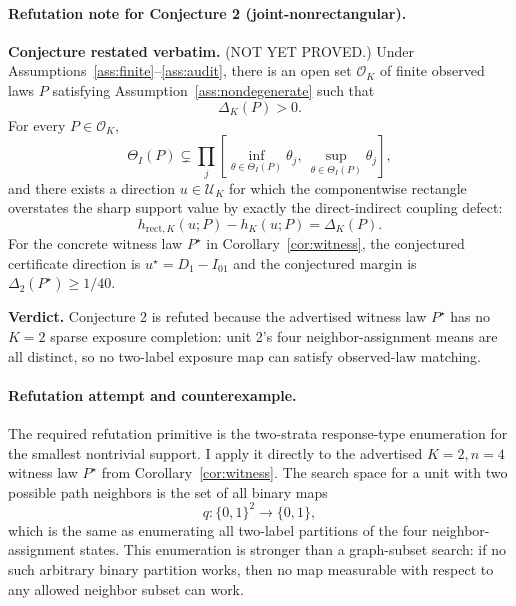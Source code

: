 \paragraph{Refutation note for Conjecture 2 (joint-nonrectangular).}
\textbf{Conjecture restated verbatim.}
(NOT YET PROVED.)  Under Assumptions~\ref{ass:finite}--\ref{ass:audit}, there is an open set \(\mathcal O_K\) of finite observed laws \(P\) satisfying Assumption~\ref{ass:nondegenerate} such that
\[
\Delta_K(P)>0.
\]
For every \(P\in\mathcal O_K\),
\[
\Theta_I(P)\subsetneq
\prod_j [\inf_{\theta\in\Theta_I(P)}\theta_j,\ \sup_{\theta\in\Theta_I(P)}\theta_j],
\]
and there exists a direction \(u\in\mathcal U_K\) for which the componentwise rectangle overstates the sharp support value by exactly the direct-indirect coupling defect:
\[
h_{\mathrm{rect},K}(u;P)-h_K(u;P)=\Delta_K(P).
\]
For the concrete witness law \(P^\star\) in Corollary~\ref{cor:witness}, the conjectured certificate direction is \(u^\star=D_1-I_{01}\) and the conjectured margin is \(\Delta_2(P^\star)\ge1/40\).

\textbf{Verdict.}
Conjecture 2 is refuted because the advertised witness law \(P^\star\) has no \(K=2\) sparse exposure completion: unit 2's four neighbor-assignment means are all distinct, so no two-label exposure map can satisfy observed-law matching.

\paragraph{Refutation attempt and counterexample.}
The required refutation primitive is the two-strata response-type enumeration for the smallest nontrivial support.  I apply it directly to the advertised \(K=2,n=4\) witness law \(P^\star\) from Corollary~\ref{cor:witness}.  The search space for a unit with two possible path neighbors is the set of all binary maps
\[
q:\{0,1\}^2\to\{0,1\},
\]
which is the same as enumerating all two-label partitions of the four neighbor-assignment states.  This enumeration is stronger than a graph-subset search: if no such arbitrary binary partition works, then no map measurable with respect to any allowed neighbor subset can work.

